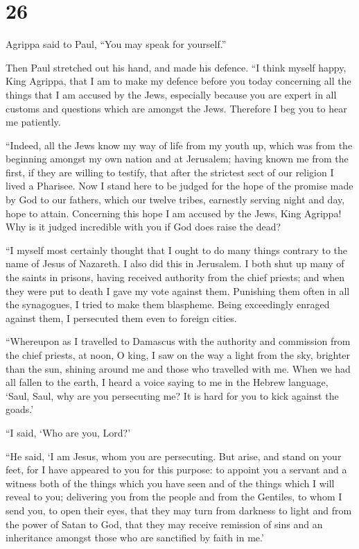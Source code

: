 \hypertarget{section-25}{%
\section{26}\label{section-25}}

 Agrippa said to Paul, ``You may speak for yourself.''

Then Paul stretched out his hand, and made his defence. 
``I think myself happy, King Agrippa, that I am to make my defence
before you today concerning all the things that I am accused by the
Jews,  especially because you are expert in all customs
and questions which are amongst the Jews. Therefore I beg you to hear me
patiently.

 ``Indeed, all the Jews know my way of life from my youth
up, which was from the beginning amongst my own nation and at Jerusalem;
 having known me from the first, if they are willing to
testify, that after the strictest sect of our religion I lived a
Pharisee.  Now I stand here to be judged for the hope of
the promise made by God to our fathers,  which our twelve
tribes, earnestly serving night and day, hope to attain. Concerning this
hope I am accused by the Jews, King Agrippa!  Why is it
judged incredible with you if God does raise the dead?

 ``I myself most certainly thought that I ought to do many
things contrary to the name of Jesus of Nazareth.  I also
did this in Jerusalem. I both shut up many of the saints in prisons,
having received authority from the chief priests; and when they were put
to death I gave my vote against them.  Punishing them
often in all the synagogues, I tried to make them blaspheme. Being
exceedingly enraged against them, I persecuted them even to foreign
cities.

 ``Whereupon as I travelled to Damascus with the
authority and commission from the chief priests,  at
noon, O king, I saw on the way a light from the sky, brighter than the
sun, shining around me and those who travelled with me. 
When we had all fallen to the earth, I heard a voice saying to me in the
Hebrew language, `Saul, Saul, why are you persecuting me? It is hard for
you to kick against the goads.'

 ``I said, `Who are you, Lord?'

``He said, `I am Jesus, whom you are persecuting.  But
arise, and stand on your feet, for I have appeared to you for this
purpose: to appoint you a servant and a witness both of the things which
you have seen and of the things which I will reveal to you;
 delivering you from the people and from the Gentiles, to
whom I send you,  to open their eyes, that they may turn
from darkness to light and from the power of Satan to God, that they may
receive remission of sins and an inheritance amongst those who are
sanctified by faith in me.'

